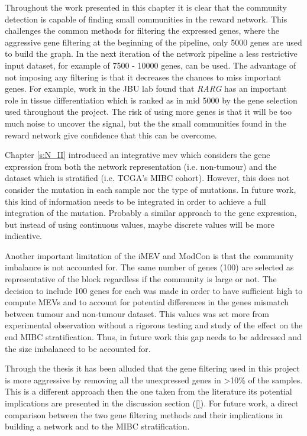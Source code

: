 Throughout the work presented in this chapter it is clear that the community detection is capable of finding small communities in the reward network. This challenges the common methods for filtering the expressed genes, where  the aggressive gene filtering at the beginning of the pipeline, only 5000 genes are used to build the graph. In the next iteration of the network pipeline a less restrictive input dataset, for example of 7500 - 10000 genes, can be used. The advantage of not imposing any filtering is that it decreases the chances to miss important genes. For example, work in the JBU lab found that \textit{RARG} has an important role in tissue differentiation which is ranked as in mid 5000 by the gene selection used throughout the project. The risk of using more genes is that it will be too much noise to uncover the signal, but the the small communities found in the reward network give confidence that this can be overcome.

Chapter \cref{s:N_II} introduced an integrative \acrfull{mev} which considers the gene expression from both the network representation (i.e. non-tumour) and the dataset which is stratified (i.e. TCGA's MIBC cohort). However, this does not consider the mutation in each sample nor the type of mutations. In future work, this kind of information needs to be integrated in order to achieve a full integration of the mutation. Probably a similar approach to the gene expression, but instead of using continuous values, maybe discrete values will be more indicative.

Another important limitation of the iMEV and ModCon is that the community imbalance is not accounted for. The same number of genes (100) are selected as representative of the block regardless if the community is large or not. The decision to include 100 genes for each was made in order to have sufficient high to compute MEVs and to account for potential differences in the genes mismatch between tumour and non-tumour dataset. This values was set more from experimental observation without a rigorous testing and study of the effect on the end MIBC stratification. Thus, in future work this gap needs to be addressed and the size imbalanced to be accounted for.

Through the thesis it has been alluded that the gene filtering used in this project is more aggressive by removing all the unexpressed genes in >10\% of the samples. This is a different approach then the one taken from the literature its potential implications are presented in the discussion section (\ref{}). For future work, a direct comparison between the two gene filtering methods and their implications in building a network and to the MIBC stratification.

